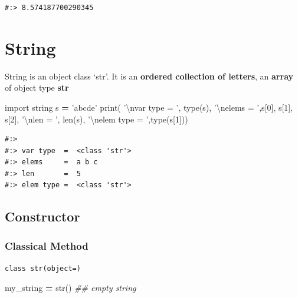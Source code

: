 \documentclass[
]{book}
\newenvironment{Shaded}{\begin{snugshade}}{\end{snugshade}}
\newcommand{\BuiltInTok}[1]{#1}
\newcommand{\CharTok}[1]{\textcolor[rgb]{0.5,0.5,0.5}{#1}}
\newcommand{\CommentTok}[1]{\textcolor[rgb]{0.37,0.37,0.37}{\textit{#1}}}
\newcommand{\DecValTok}[1]{\textcolor[rgb]{0.06,0.06,0.06}{#1}}
\newcommand{\ImportTok}[1]{#1}
\newcommand{\NormalTok}[1]{#1}
\newcommand{\OperatorTok}[1]{\textcolor[rgb]{0.43,0.43,0.43}{\textbf{#1}}}
\newcommand{\StringTok}[1]{\textcolor[rgb]{0.5,0.5,0.5}{#1}}
\begin{document}
\begin{verbatim}
#:> 8.574187700290345
\end{verbatim}

\hypertarget{string}{%
\section{String}\label{string}}

String is an object class `str'. It is an \textbf{ordered collection of letters}, an \textbf{array} of object type \textbf{str}

\begin{Shaded}
\begin{Highlighting}[]
\ImportTok{import}\NormalTok{ string}
\NormalTok{s }\OperatorTok{=} \StringTok{'abcde'}
\BuiltInTok{print}\NormalTok{( }\StringTok{'}\CharTok{\textbackslash{}n}\StringTok{var type  = '}\NormalTok{, }\BuiltInTok{type}\NormalTok{(s),}
       \StringTok{'}\CharTok{\textbackslash{}n}\StringTok{elems     = '}\NormalTok{,s[}\DecValTok{0}\NormalTok{], s[}\DecValTok{1}\NormalTok{], s[}\DecValTok{2}\NormalTok{],}
       \StringTok{'}\CharTok{\textbackslash{}n}\StringTok{len       = '}\NormalTok{, }\BuiltInTok{len}\NormalTok{(s),}
       \StringTok{'}\CharTok{\textbackslash{}n}\StringTok{elem type = '}\NormalTok{,}\BuiltInTok{type}\NormalTok{(s[}\DecValTok{1}\NormalTok{]))}
\end{Highlighting}
\end{Shaded}

\begin{verbatim}
#:> 
#:> var type  =  <class 'str'> 
#:> elems     =  a b c 
#:> len       =  5 
#:> elem type =  <class 'str'>
\end{verbatim}

\hypertarget{constructor}{%
\subsection{Constructor}\label{constructor}}

\hypertarget{classical-method}{%
\subsubsection{Classical Method}\label{classical-method}}

\texttt{class\ str(object=\textquotesingle{}\textquotesingle{})}

\begin{Shaded}
\begin{Highlighting}[]
\NormalTok{my_string }\OperatorTok{=} \BuiltInTok{str}\NormalTok{()        }\CommentTok{## empty string}
\end{Highlighting}
\end{Shaded}
\end{document}
